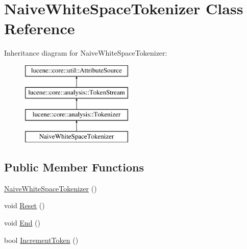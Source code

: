 \hypertarget{classNaiveWhiteSpaceTokenizer}{}\section{Naive\+White\+Space\+Tokenizer Class Reference}
\label{classNaiveWhiteSpaceTokenizer}
Inheritance diagram for Naive\+White\+Space\+Tokenizer\+:\begin{figure}[H]
\begin{center}
\leavevmode
\includegraphics[height=4.000000cm]{classNaiveWhiteSpaceTokenizer}
\end{center}
\end{figure}
\subsection*{Public Member Functions}
\begin{DoxyCompactItemize}
\item 
\mbox{\hyperlink{classNaiveWhiteSpaceTokenizer_a4364bb2206efa47c4ea1cb9eb421d3ec}{Naive\+White\+Space\+Tokenizer}} ()
\item 
void \mbox{\hyperlink{classNaiveWhiteSpaceTokenizer_aa532e6a3e2fa6a9ebb90a4324179a30f}{Reset}} ()
\item 
void \mbox{\hyperlink{classNaiveWhiteSpaceTokenizer_a4c4f4debc08aa3e05b07b782144b5ae6}{End}} ()
\item 
bool \mbox{\hyperlink{classNaiveWhiteSpaceTokenizer_aa1dcc35eedacdb6107441cb9010d60b0}{Increment\+Token}} ()
\end{DoxyCompactItemize}
